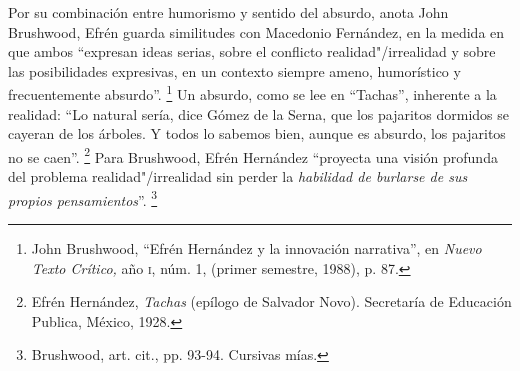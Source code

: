 \documentclass[14pt,twoside,final]{extbook} %
\let\oldfootnote\footnote
\renewcommand\footnote[1]{%
\oldfootnote{\hspace{1mm}#1}}
\begin{document}
Por su combinación entre humorismo y sentido del absurdo, anota John Brushwood, Efrén guarda similitudes con Macedonio Fernández, en la medida en que ambos ``expresan ideas serias, sobre el conflicto realidad"/irrealidad y sobre las posibilidades expresivas, en un contexto siempre ameno, humorístico y frecuentemente absurdo''.\footnote{John Brushwood, ``Efrén Hernández y la innovación narrativa'', en \emph{Nuevo Texto Crítico,} año \textsc{i}, núm. 1, (primer semestre, 1988), p. 87.} Un absurdo, como se lee en ``Tachas'', inherente a la realidad: ``Lo natural sería, dice Gómez de la Serna, que los pajaritos dormidos se cayeran de los árboles. Y todos lo sabemos bien, aunque es absurdo, los pajaritos no se caen''.\footnote{Efrén Hernández, \emph{Tachas} (epílogo de Salvador Novo). Secretaría de Educación Publica, México, 1928.} Para Brushwood, Efrén Hernández ``proyecta una visión profunda del problema realidad"/irrealidad sin perder la \emph{habilidad de burlarse de sus propios pensamientos}''.\footnote{Brushwood, art. cit., pp. 93-94. Cursivas mías.}
\end{document}
